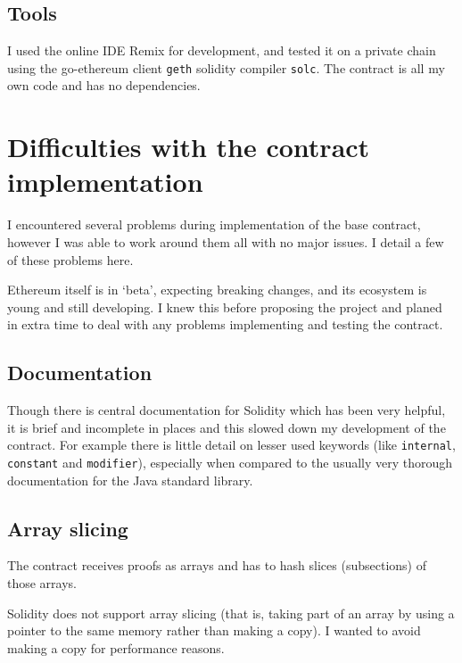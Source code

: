 \documentclass[12pt,a4paper,twoside,openright]{report}
\begin{document}
\subsection{Tools}

I used the online IDE Remix \cite{browser-solidity} for development, and tested it on a private chain using the go-ethereum client \texttt{geth}
solidity compiler \texttt{solc}.
The contract is all my own code and has no dependencies.



\section{Difficulties with the contract implementation}

I encountered several problems during implementation of the base contract, however I was able to work around them all with no major issues.
I detail a few of these problems here.

Ethereum itself is in `beta', expecting breaking changes, and its ecosystem is young and still developing.
I knew this before proposing the project and planed in extra time to deal with any problems implementing and testing the contract.

\subsection{Documentation}

Though there is central documentation for Solidity which has been very helpful, it is brief and incomplete in places and this slowed down my development of the contract.
For example there is little detail on lesser used keywords (like \texttt{internal}, \texttt{constant} and \texttt{modifier}), especially when compared to the usually very thorough documentation for the Java standard library.

\subsection{Array slicing}

The contract receives proofs as arrays and has to hash slices (subsections) of those arrays.

Solidity does not support array slicing (that is, taking part of an array by using a pointer to the same memory rather than making a copy).
I wanted to avoid making a copy for performance reasons.
\end{document}
